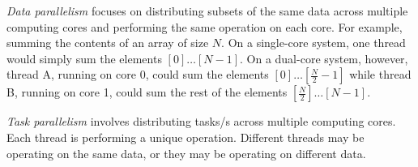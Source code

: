 \begin{definition}\label{def:Data_Parallelism}
  \emph{Data parallelism} focuses on distributing subsets of the same data across multiple computing cores and performing the same operation on each core.
  For example, summing the contents of an array of size $N$.
  On a single-core system, one thread would simply sum the elements $[0] \ldots [N-1]$.
  On a dual-core system, however, thread A, running on core 0, could sum the elements $[0] \ldots [\frac{N}{2}-1]$ while thread B, running on core 1, could sum the rest of the elements $[\frac{N}{2}] \ldots [N-1]$.
\end{definition}

\begin{definition}\label{def:Task_Parallelism}
  \emph{Task parallelism} involves distributing tasks/s across multiple computing cores.
  Each thread is performing a unique operation.
  Different threads may be operating on the same data, or they may be operating on different data.
\end{definition}









